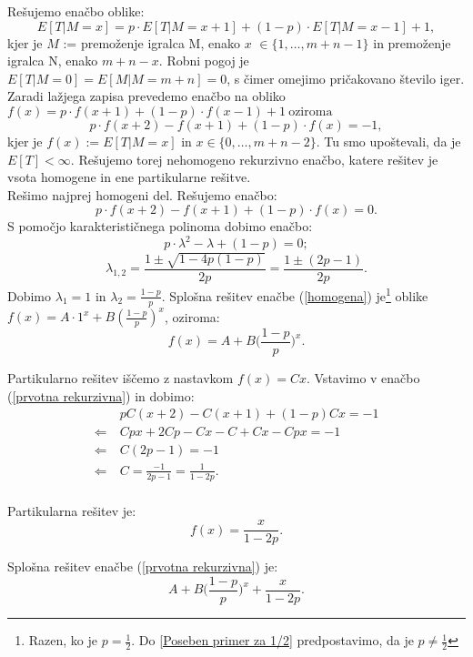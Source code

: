 \documentclass[12pt, a4paper]{article}
\begin{document}
Rešujemo enačbo oblike: $$E[T|M=x] = p\cdot E[T|M=x+1] + (1-p)\cdot E[T|M=x-1] + 1,$$ kjer je $M$ := premoženje igralca M, enako $x$ $\in \{1, \dots, m+n-1\}$ in premoženje igralca N, enako $m+n-x$. Robni pogoj je $E[T|M=0]=E[M|M=m+n]=0$, s čimer omejimo pričakovano število iger. Zaradi lažjega zapisa prevedemo enačbo na obliko $f(x) = p\cdot f(x+1) + (1-p) \cdot f(x-1) + 1 ~ \textrm{oziroma} $ 
\begin{equation}
\label{prvotna rekurzivna}
p\cdot f(x+2) - f(x+1) + (1-p)\cdot f(x) = -1,
\end{equation}
kjer je $f(x):=E[T|M=x]$ in $x \in \{0, \dots, m+n-2\}$. Tu smo upoštevali, da je $E[T] < \infty$. 
Rešujemo torej nehomogeno rekurzivno enačbo, katere rešitev je vsota homogene in ene partikularne rešitve. \\

Rešimo najprej homogeni del. Rešujemo enačbo: 
\begin{equation}
\label{homogena}
p\cdot f(x+2) - f(x+1) + (1-p)\cdot f(x) = 0.
\end{equation}
S pomočjo karakterističnega polinoma dobimo enačbo: $$p\cdot  \lambda ^2 - \lambda + (1-p) = 0;$$ $$\lambda _{1, 2}= \frac{1 \pm \sqrt{1 - 4p(1-p)}}{2p} = \frac{1 \pm (2p-1)}{2p}.$$
Dobimo $\lambda _{1} = 1$ in $\lambda _{2} = \frac{1-p}{p}$. Splošna rešitev enačbe (\ref{homogena}) je\footnote{Razen, ko je $p=\frac{1}{2}$. Do \ref{Poseben primer za 1/2} predpostavimo, da je $p\neq\frac{1}{2}$} oblike $f(x) = A\cdot 1^x + B(\frac{1-p}{p})^x$, oziroma: $$f(x)=A+ B \bigg( \frac{1-p}{p} \bigg )^x. $$

Partikularno rešitev iščemo z nastavkom $f(x)=Cx$. Vstavimo v enačbo (\ref{prvotna rekurzivna}) in dobimo: 
\begin{equation*}
\begin{split}
 &~pC(x+2)-C(x+1)+(1-p)Cx=-1\\
\Leftarrow & ~Cpx+2Cp-Cx-C+Cx-Cpx=-1 \\
\Leftarrow & ~C(2p-1)=-1\\
\Leftarrow & ~C=\frac{-1}{2p-1} = \frac{1}{1-2p}.\\
\end{split}
\end{equation*}
 
Partikularna rešitev je: $$f(x)=\frac{x}{1-2p}.$$

Splošna rešitev enačbe (\ref{prvotna rekurzivna}) je: $$A + B\bigg( \frac{1-p}{p} \bigg )^x+\frac{x}{1-2p}.$$
\end{document}

